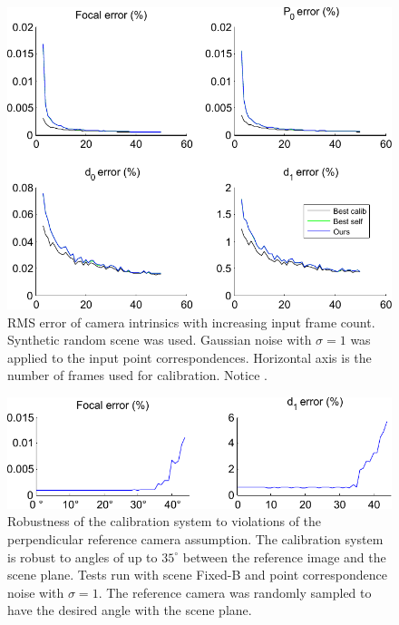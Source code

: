 \documentclass[10pt,twocolumn,letterpaper]{article}
\begin{document}
\begin{figure}
\centering
\includegraphics[width=\linewidth]{images/resultsFrameCount.pdf}
\caption{RMS error of camera intrinsics with increasing input frame count. Synthetic random scene was used. Gaussian noise with $\sigma=1$ was applied to the input point correspondences. Horizontal axis is the number of frames used for calibration. Notice .}
\label{fig:results_noise}
\end{figure}

\begin{figure}
\centering
\includegraphics[width=\linewidth]{images/resultsNormalAngle.pdf}
\caption{Robustness of the calibration system to violations of the perpendicular reference camera assumption. The calibration system is robust to angles of up to $35^\circ$ between the reference image and the scene plane. Tests run with scene Fixed-B and point correspondence noise with $\sigma=1$. The reference camera was randomly sampled to have the desired angle with the scene plane.}
\label{fig:results_normal_angle}
\end{figure}
\end{document}
